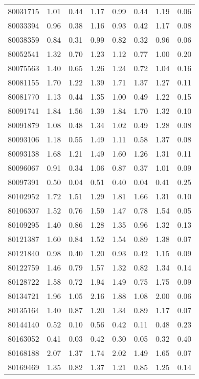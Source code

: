 \begin{longtable}{|c|c c c|c c c|c|}
80031715 & 1.01 & 0.44 & 1.17 & 0.99 & 0.44 & 1.19 & 0.06 \\
80033394 & 0.96 & 0.38 & 1.16 & 0.93 & 0.42 & 1.17 & 0.08 \\
80038359 & 0.84 & 0.31 & 0.99 & 0.82 & 0.32 & 0.96 & 0.06 \\
80052541 & 1.32 & 0.70 & 1.23 & 1.12 & 0.77 & 1.00 & 0.20 \\
80075563 & 1.40 & 0.65 & 1.26 & 1.24 & 0.72 & 1.04 & 0.16 \\
80081155 & 1.70 & 1.22 & 1.39 & 1.71 & 1.37 & 1.27 & 0.11 \\
80081770 & 1.13 & 0.44 & 1.35 & 1.00 & 0.49 & 1.22 & 0.15 \\
80091741 & 1.84 & 1.56 & 1.39 & 1.84 & 1.70 & 1.32 & 0.10 \\
80091879 & 1.08 & 0.48 & 1.34 & 1.02 & 0.49 & 1.28 & 0.08 \\
80093106 & 1.18 & 0.55 & 1.49 & 1.11 & 0.58 & 1.37 & 0.08 \\
80093138 & 1.68 & 1.21 & 1.49 & 1.60 & 1.26 & 1.31 & 0.11 \\
80096067 & 0.91 & 0.34 & 1.06 & 0.87 & 0.37 & 1.01 & 0.09 \\
\rowcolor{lightgray}80097391 & 0.50 & 0.04 & 0.51 & 0.40 & 0.04 & 0.41 & 0.25 \\
80102952 & 1.72 & 1.51 & 1.29 & 1.81 & 1.66 & 1.31 & 0.10 \\
80106307 & 1.52 & 0.76 & 1.59 & 1.47 & 0.78 & 1.54 & 0.05 \\
80109295 & 1.40 & 0.86 & 1.28 & 1.35 & 0.96 & 1.32 & 0.13 \\
80121387 & 1.60 & 0.84 & 1.52 & 1.54 & 0.89 & 1.38 & 0.07 \\
80121840 & 0.98 & 0.40 & 1.20 & 0.93 & 0.42 & 1.15 & 0.09 \\
80122759 & 1.46 & 0.79 & 1.57 & 1.32 & 0.82 & 1.34 & 0.14 \\
80128722 & 1.58 & 0.72 & 1.94 & 1.49 & 0.75 & 1.75 & 0.09 \\
80134721 & 1.96 & 1.05 & 2.16 & 1.88 & 1.08 & 2.00 & 0.06 \\
80135164 & 1.40 & 0.87 & 1.20 & 1.34 & 0.89 & 1.17 & 0.07 \\
\rowcolor{lightgray}80144140 & 0.52 & 0.10 & 0.56 & 0.42 & 0.11 & 0.48 & 0.23 \\
\rowcolor{lightgray}80163052 & 0.41 & 0.03 & 0.42 & 0.30 & 0.05 & 0.32 & 0.40 \\
80168188 & 2.07 & 1.37 & 1.74 & 2.02 & 1.49 & 1.65 & 0.07 \\
80169469 & 1.35 & 0.82 & 1.37 & 1.21 & 0.85 & 1.25 & 0.14 \\

\end{longtable}

